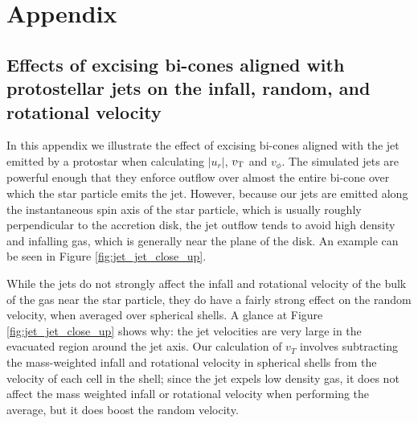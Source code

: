 \documentclass[../dissertation.tex]{subfiles}
\begin{document}
%
%
%
%
\section{Appendix}

\subsection{Effects of excising bi-cones aligned with protostellar jets on the infall, random, and rotational velocity} \label{sec:jet_jet_cone_sub}
In this appendix we illustrate the effect of excising bi-cones aligned with the jet emitted by a protostar when calculating $\lvert u_r \rvert$, $v_{\rm T}$ and $v_\phi$. The simulated jets are powerful enough that they enforce outflow over almost the entire bi-cone over which the star particle emits the jet. However, because our jets are emitted along the instantaneous spin axis of the star particle, which is usually roughly perpendicular to the accretion disk, the jet outflow tends to avoid high density and infalling gas, which is generally near the plane of the disk. An example can be seen in Figure \ref{fig:jet_jet_close_up}.

While the jets do not strongly affect the infall and rotational velocity of the bulk of the gas near the star particle, they do have a fairly strong effect on the random velocity, when averaged over spherical shells. A glance at Figure \ref{fig:jet_jet_close_up} shows why: the jet velocities are very large in the evacuated region around the jet axis. Our calculation of $v_T$ involves subtracting the mass-weighted infall and rotational velocity in spherical shells from the velocity of each cell in the shell; since the jet expels low density gas, it does not affect the mass weighted infall or rotational velocity when performing the average, but it does boost the random velocity.
\end{document}
